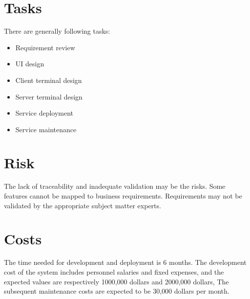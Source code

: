 \documentclass{scrreprt}
\begin{document}
\section{Tasks}
There are generally following tasks:
\begin{itemize}
    \item Requirement review
    \item UI design
    \item Client terminal design
    \item Server terminal design
    \item Service deployment
    \item Service maintenance
\end{itemize}
\section{Risk}
The lack of traceability and inadequate validation may be the risks. Some features cannot be mapped to business requirements. Requirements may not be validated by the appropriate subject matter experts.

\section{Costs}
The time needed for development and deployment is 6 months. The development cost of the system includes personnel salaries and fixed expenses, and the expected values ​​are respectively 1000,000 dollars and 2000,000 dollars, The subsequent maintenance costs are expected to be 30,000 dollars per month.
\end{document}
